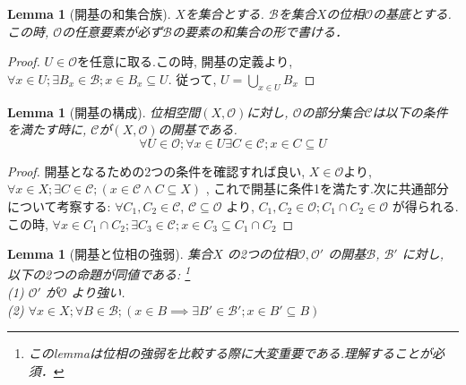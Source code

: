\documentclass[lualatex]{ltjsbook}
\newtheorem{lemma}[theorem]{Lemma}
\theoremstyle{remark}
\theoremstyle{plain}
\begin{document}
\begin{lemma}[開基の和集合族]
	$X$を集合とする. $\mathcal{B}$を集合$X$の位相$\mathcal{O}$の基底とする.この時,  $\mathcal{O}$の任意要素が必ず$\mathcal{B}$の要素の和集合の形で書ける．
\end{lemma}

\begin{proof}
	$U\in \mathcal{O}$を任意に取る.この時,  開基の定義より,  $\forall x \in U ; \exists B_x \in \mathcal{B}; x \in B_x \subseteq U.$ 従って,  $U=\bigcup_{x \in U}B_x$
\end{proof}





\begin{lemma}[開基の構成]\label{lem:1od}
	位相空間$(X, \mathcal{O})$に対し,  $\mathcal{O}$の部分集合$\mathcal{C}$は以下の条件を満たす時に,  $\mathcal{C}$が$(X, \mathcal{O})$の開基である.
	$$\forall U \in \mathcal{O};\forall x \in U \exists C \in \mathcal{C}; x \in C \subseteq U$$
\end{lemma}

\begin{proof}
	開基となるための2つの条件を確認すれば良い,  
	$X \in \mathcal{O}$より,  
	$\forall x \in X; \exists C \in \mathcal{C}; \left( x \in \mathcal{C} \land C \subseteq X  \right)  $ , 
	これで開基に条件1を満たす.次に共通部分について考察する: 
	$\forall C_1 ,  C_2  \in \mathcal{C} $, 
	$ \mathcal{C} \subseteq \mathcal{O}$ より,  
	$C_1 ,  C_2 \in \mathcal{O}; C_1 \cap C_2 \in \mathcal{O}$ が得られる.
	この時,  $\forall x \in C_1 \cap C_2; \exists C_3 \in \mathcal{C} ; x \in C_3 \subseteq C_1 \cap C_2$
\end{proof}






\begin{lemma}[開基と位相の強弱]
	集合$X$ の2つの位相$\mathcal{O} ,  \mathcal{O'}$ の開基$ \mathcal{B}$,  $ \mathcal{B'}$ に対し,  
	以下の2つの命題が同値である: \footnote{このlemmaは位相の強弱を比較する際に大変重要である.理解することが必須．}\\
	(1) $\mathcal{O'}$ が$\mathcal{O}$ より強い.\\
	(2) $\forall x \in X; \forall B \in \mathcal{B} ; \left( x \in B \implies  \exists B' \in  \mathcal{B'} ; x \in B' \subseteq B \right) $
\end{lemma}
\end{document}
